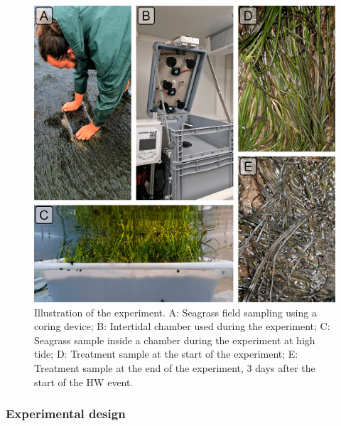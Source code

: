 \documentclass[
  letterpaper,
  11pt,
  english,
  singlespacing,
  headsepline]{MastersDoctoralThesis}
\begin{document}
\begin{spacing}{1.5}
\begin{figure}
{\includegraphics[width=0.95\linewidth,height=\textheight,keepaspectratio]{Chapter5/Figs/Experimental_design.png}

}

\caption{\label{fig-design_h}Illustration of the experiment. A: Seagrass
field sampling using a coring device; B: Intertidal chamber used during
the experiment; C: Seagrass sample inside a chamber during the
experiment at high tide; D: Treatment sample at the start of the
experiment; E: Treatment sample at the end of the experiment, 3 days
after the start of the HW event.}

\end{figure}%

\subsubsection{Experimental design}\label{experimental-design}


\end{spacing}
\end{document}
